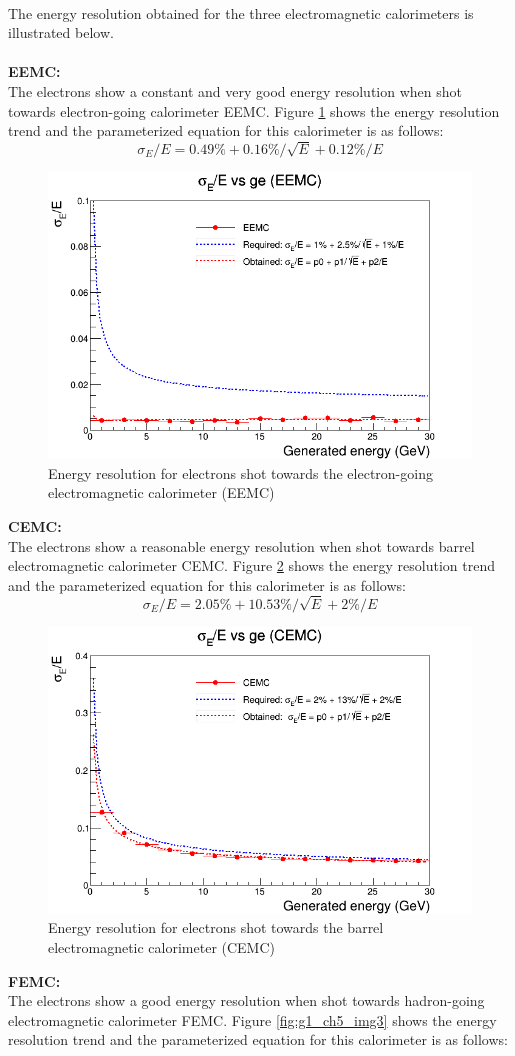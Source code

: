 \\
The energy resolution obtained for the three electromagnetic calorimeters is illustrated below.\\
\\
\textbf{EEMC:}\\
The electrons show a constant and very good energy resolution when shot towards electron-going calorimeter EEMC. Figure \ref{fig:g1_ch5_img1} shows the energy resolution trend and the parameterized equation for this calorimeter is as follows:
$$\sigma _E/E = 0.49\% + 0.16\%/\sqrt{E} + 0.12\%/E $$
\begin{figure}[H]
        \centering  
		\includegraphics[width=0.5\linewidth]{group1/Resolution_EEMC.png}
		\caption{Energy resolution for electrons shot towards the electron-going electromagnetic calorimeter (EEMC)}
		\label{fig:g1_ch5_img1}
\end{figure}

\textbf{CEMC:}\\
The electrons show a reasonable energy resolution when shot towards barrel electromagnetic calorimeter CEMC. Figure \ref{fig:g1_ch5_img2} shows the energy resolution trend and the parameterized equation for this calorimeter is as follows:
$$\sigma _E/E = 2.05\% + 10.53\%/\sqrt{E} + 2\%/E $$
\begin{figure}
        \centering  
		\includegraphics[width=0.5\linewidth]{group1/Resolution_CEMC.png}
		\caption{Energy resolution for electrons shot towards the barrel electromagnetic calorimeter (CEMC)}
		\label{fig:g1_ch5_img2}
\end{figure}
\textbf{FEMC:}\\
The electrons show a good energy resolution when shot towards hadron-going electromagnetic calorimeter FEMC. Figure \ref{fig:g1_ch5_img3} shows the energy resolution trend and the parameterized equation for this calorimeter is as follows:

